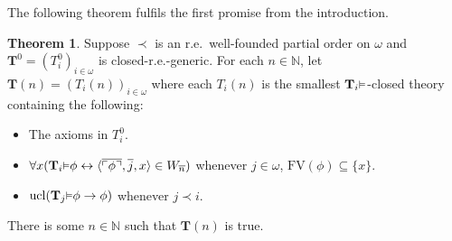 \documentclass[reqno]{article}
\theoremstyle{definition}
\newtheorem{theorem}{Theorem}
\def\N{\mathbb{N}}
\def\T{\mathbf{T}}
\def\FV{\mathrm{FV}}
\renewcommand{\Pr}[1]{\T_{#1}\mbox{\small${\vDash}$}}
\newcommand{\ucl}[1]{\mathrm{ucl}(#1)}
\begin{document}
The following theorem fulfils the first promise from the introduction.


\begin{theorem}
\label{onethreethree}
Suppose $\prec$ is an r.e.~well-founded
partial order on $\omega$
and $\T^0=(T^0_i)_{i\in \omega}$ is closed-r.e.-generic.
For each $n\in\N$,
let $\T(n)=(T_i(n))_{i\in \omega}$
where each $T_i(n)$ is the smallest $\Pr i$-closed theory
containing the following:
\begin{itemize}
\item The axioms in $T^0_i$.
\item $\forall x(\Pr i\phi\leftrightarrow\langle\overline{\ulcorner\phi\urcorner},\overline j,x\rangle\in W_{\overline n})$
whenever $j\in\omega$, 
$\FV(\phi)\subseteq\{x\}$.
\item $\ucl{\Pr j\phi\rightarrow\phi}$ whenever $j\prec i$.
\end{itemize}
There is some $n\in\N$ such that $\T(n)$ is true.
\end{theorem}
\end{document}
